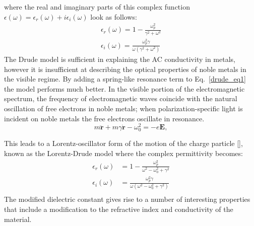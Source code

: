 where the real and imaginary parts of this complex function $\epsilon(\omega) = \epsilon_r(\omega)+i\epsilon_i(\omega)$ look as follows:
\begin{equation}
\begin{aligned}
\epsilon_r(\omega) = 1 - \frac{\omega_p^2}{\gamma^2+\omega^2}\\
\epsilon_i(\omega) = \frac{\omega_p^2\gamma}{\omega(\gamma^2+\omega^2)}
\end{aligned}
\end{equation}
The Drude model is sufficient in explaining the AC conductivity in metals, however it is insufficient at describing the optical properties of noble metals in the visible regime. By adding a spring-like resonance term to Eq.~\ref{drude_eq1} the model performs much better. In the visible portion of the electromagnetic spectrum, the frequency of electromagnetic waves coincide with the natural oscillation of free electrons in noble metals; when polarization-specific light is incident on noble metals the free electrons oscillate in resonance. 
\begin{equation}
m\ddot{\mathbf{r}}+m\gamma\dot{\mathbf{r}}-\omega_0^2 = -e\mathbf{E},
\label{drude_eq2}
\end{equation}

This leads to a Lorentz-oscillator form of the motion of the charge particle [\cite{Vial}], known as the Lorentz-Drude model where the complex permittivity becomes:
\begin{equation}
\begin{split}
\epsilon_r(\omega) &= 1-\frac{\omega_p^2}{\omega^2-\omega_0^2+\gamma^2}\\
\epsilon_i(\omega) &= \frac{\omega_p^2\gamma}{\omega(\omega^2-\omega_0^2+\gamma^2)}\\
\end{split}
\label{eps_m}
\end{equation}
The modified dielectric constant gives rise to a number of interesting properties that include a modification to the refractive index and conductivity of the material.

